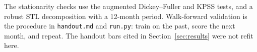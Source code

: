 \documentclass[11pt]{article}
\begin{document}
The stationarity checks use the augmented Dickey--Fuller and KPSS tests, and a robust STL decomposition with a 12-month period. Walk-forward validation is the procedure in \texttt{handout.md} and \texttt{run.py}: train on the past, score the next month, and repeat. The handout bars cited in Section~\ref{sec:results} were not refit here.
\end{document}
